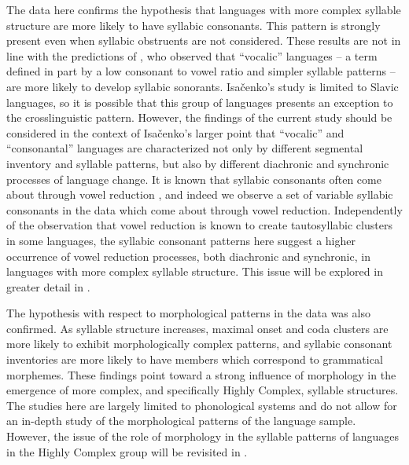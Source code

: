 The data here confirms the hypothesis that languages with more complex syllable structure are more likely to have syllabic consonants. This pattern is strongly present even when syllabic obstruents are not considered. These results are not in line with the predictions of \citet{Isačenko1939/1940}, who observed that ``vocalic'' languages -- a term defined in part by a low consonant to vowel ratio and simpler syllable patterns -- are more likely to develop syllabic sonorants. Isačenko’s study is limited to Slavic languages, so it is possible that this group of languages presents an exception to the crosslinguistic pattern. However, the findings of the current study should be considered in the context of Isačenko’s larger point that ``vocalic'' and ``consonantal'' languages are characterized not only by different segmental inventory and syllable patterns, but also by different diachronic and synchronic processes of language change. It is known that syllabic consonants often come about through vowel reduction \citep{Bell1978a}, and indeed we observe a set of variable syllabic consonants in the data which come about through vowel reduction. Independently of the observation that vowel reduction is known to create tautosyllabic clusters in some languages, the syllabic consonant patterns here suggest a higher occurrence of vowel reduction processes, both diachronic and synchronic, in languages with more complex syllable structure. This issue will be explored in greater detail in .

The hypothesis with respect to morphological patterns in the data was also confirmed. As syllable structure increases, maximal onset and coda clusters are more likely to exhibit morphologically complex patterns, and syllabic consonant inventories are more likely to have members which correspond to grammatical morphemes. These findings point toward a strong influence of morphology in the emergence of more complex, and specifically Highly Complex, syllable structures. The studies here are largely limited to phonological systems and do not allow for an in-depth study of the morphological patterns of the language sample. However, the issue of the role of morphology in the syllable patterns of languages in the Highly Complex group will be revisited in .

